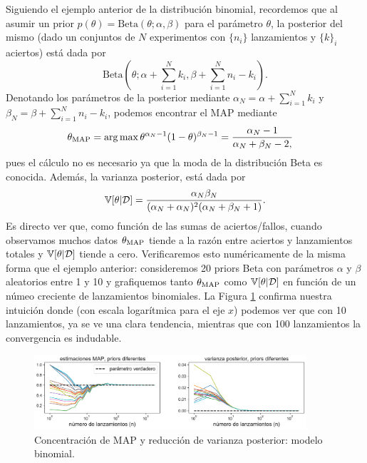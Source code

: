 \begin{mdframed}[style=ejemplo, frametitle={\center Ejemplo: MAP para el modelo binomial}]

Siguiendo el ejemplo anterior de la distribución binomial, recordemos que al asumir un prior $p(\theta) = \text{Beta}\left(\theta; \alpha,\beta \right)$ para el parámetro $\theta$, la posterior del mismo (dado un conjuntos de $N$ experimentos con $\{n_i\}$ lanzamientos  y $\{k\}_i$ aciertos) está dada por 
\begin{equation}
  	\text{Beta}\left(\theta; \alpha + \sum_{i=1}^N k_i, \beta + \sum_{i=1}^N n_i - k_i \right).
  \end{equation}
  Denotando los parámetros de la posterior mediante $\alpha_N = \alpha + \sum_{i=1}^N k_i$ y $\beta_N = \beta + \sum_{i=1}^N n_i-k_i$, podemos encontrar el MAP mediante
  \begin{align}
  	\theta_\text{MAP} &= \operatorname*{arg\,max} \theta^{\alpha_N - 1}(1-\theta)^{\beta_N -1} = \frac{\alpha_N - 1}{\alpha_N + \beta_N - 2,
  	}\nonumber
  \end{align}
  pues el cálculo no es necesario ya que la moda de la distribución Beta es conocida. Además, la varianza posterior, está dada por 
  \begin{equation}
  	\operatorname{\mathbb{V}}[\theta|{\mathcal D}] = \frac{\alpha_N \beta_N }{(\alpha_N  + \alpha_N )^2(\alpha_N  + \beta_N +1)}.
  \end{equation}
  Es directo ver que, como función de las sumas de aciertos/fallos, cuando  observamos muchos datos $\theta_\text{MAP}$ tiende a la razón entre aciertos y lanzamientos  totales y $\operatorname{\mathbb{V}}[\theta|{\mathcal D}] $ tiende a cero. Verificaremos esto numéricamente de la misma forma que el ejemplo anterior: consideremos 20 priors Beta con parámetros $\alpha$ y $\beta$ aleatorios entre 1 y 10 y grafiquemos tanto $\theta_\text{MAP}$ como $\operatorname{\mathbb{V}}[\theta|{\mathcal D}] $ en función de un númeo creciente de lanzamientos binomiales. La Figura \ref{fig:binomial_MAP} confirma nuestra intuición donde (con escala logarítmica para el eje $x$) podemos ver que con 10 lanzamientos, ya se ve una clara tendencia, mientras que con 100 lanzamientos la convergencia es indudable. 

\begin{figure}[H]
	\centering
	\includegraphics[width=0.9\textwidth]{img/cap2_bayesian_binomial_MAP.pdf}
	\caption{Concentración de MAP y reducción de varianza posterior: modelo binomial.}
	\label{fig:binomial_MAP}
\end{figure}

\end{mdframed}

